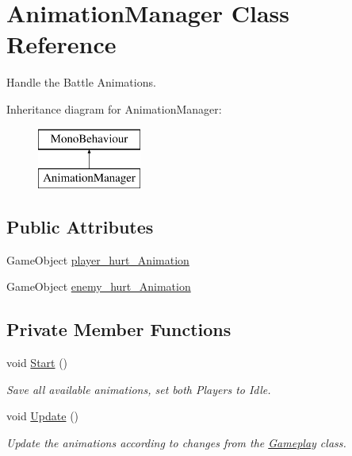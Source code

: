 \hypertarget{class_animation_manager}{}\section{Animation\+Manager Class Reference}
\label{class_animation_manager}


Handle the Battle Animations.  


Inheritance diagram for Animation\+Manager\+:\begin{figure}[H]
\begin{center}
\leavevmode
\includegraphics[height=2.000000cm]{class_animation_manager}
\end{center}
\end{figure}
\subsection*{Public Attributes}
\begin{DoxyCompactItemize}
\item 
Game\+Object \mbox{\hyperlink{class_animation_manager_a54734a6a94c300598882d4fa6f17f68d}{player\+\_\+hurt\+\_\+\+Animation}}
\item 
Game\+Object \mbox{\hyperlink{class_animation_manager_a3cd204fdfeeeec9bfa687f26a849df5a}{enemy\+\_\+hurt\+\_\+\+Animation}}
\end{DoxyCompactItemize}
\subsection*{Private Member Functions}
\begin{DoxyCompactItemize}
\item 
void \mbox{\hyperlink{class_animation_manager_a24e3383ca8d2acf1cf37211f8e9f2131}{Start}} ()
\begin{DoxyCompactList}\small\item\em Save all available animations, set both Players to Idle. \end{DoxyCompactList}\item 
void \mbox{\hyperlink{class_animation_manager_ab9a2c78491bf79117b01db0a26b7f12d}{Update}} ()
\begin{DoxyCompactList}\small\item\em Update the animations according to changes from the \mbox{\hyperlink{class_gameplay}{Gameplay}} class. \end{DoxyCompactList}\end{DoxyCompactItemize}
